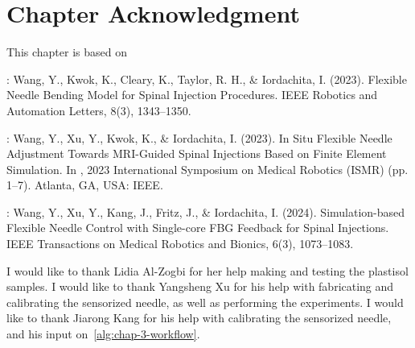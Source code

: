 \section{Chapter Acknowledgment}
\label{sec:chap-3-ack}
This chapter is based on

\parencite{wangFlexibleNeedleBending2023}: Wang, Y., Kwok, K., Cleary, K., Taylor, R. H., \& Iordachita, I. (2023). Flexible Needle Bending Model for Spinal Injection Procedures. IEEE Robotics and Automation Letters, 8(3), 1343–1350.

\parencite{wangSituFlexibleNeedle2023}: Wang, Y., Xu, Y., Kwok, K., \& Iordachita, I. (2023). In Situ Flexible Needle Adjustment Towards MRI-Guided Spinal Injections Based on Finite Element Simulation. In , 2023 International Symposium on Medical Robotics (ISMR) (pp. 1–7). Atlanta, GA, USA: IEEE.

\parencite{wangSimulationbasedFlexibleNeedle2024}: Wang, Y., Xu, Y., Kang, J., Fritz, J., \& Iordachita, I. (2024). Simulation-based Flexible Needle Control with Single-core FBG Feedback for Spinal Injections. IEEE Transactions on Medical Robotics and Bionics, 6(3), 1073–1083. 

I would like to thank Lidia Al-Zogbi for her help making and testing the plastisol samples. I would like to thank Yangsheng Xu for his help with fabricating and calibrating the sensorized needle, as well as performing the experiments. I would like to thank Jiarong Kang for his help with calibrating the sensorized needle, and his input on~\cref{alg:chap-3-workflow}.

